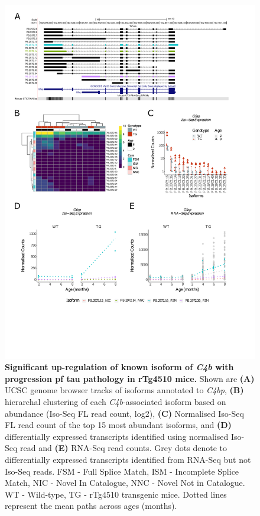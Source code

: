 \begin{figure}[!htp]
	\centering
	\includegraphics[page=2,trim={1.5cm 4.8cm 2cm 1cm}, scale = 0.85]{Figures/Ch5_DiffPlots.pdf}
	\captionsetup{width=0.95\textwidth}
	\caption[Differential \textit{C4b} transcript expression]%
	{\textbf{Significant up-regulation of known isoform of \textit{C4b} with progression pf tau pathology in rTg4510 mice.} Shown are \textbf{(A)} UCSC genome browser tracks of isoforms annotated to \textit{C4bp}, \textbf{(B)} hierarchal clustering of each \textit{C4b}-associated isoform based on abundance (Iso-Seq FL read count, log2), \textbf{(C)} Normalised Iso-Seq FL read count of the top 15 most abundant isoforms, and \textbf{(D)} differentially expressed transcripts identified using normalised Iso-Seq read and \textbf{(E)} RNA-Seq read counts. Grey dots denote to differentially expressed transcripts identified from RNA-Seq but not Iso-Seq reads. FSM - Full Splice Match, ISM - Incomplete Splice Match, NIC - Novel In Catalogue, NNC - Novel Not in Catalogue. WT - Wild-type, TG - rTg4510 transgenic mice. Dotted lines represent the mean paths across ages (months).}   
	\label{fig:DEI_c4b}
\end{figure}

